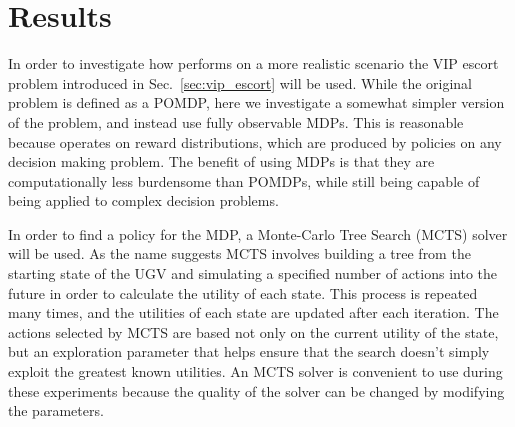 \section{Results} \label{sec:results}
In order to investigate how \xQ{} performs on a more realistic scenario the VIP escort problem introduced in Sec.~\ref{sec:vip_escort} will be used. While the original problem is defined as a POMDP, here we investigate a somewhat simpler version of the problem, and instead use fully observable MDPs. This is reasonable because \xQ{} operates on reward distributions, which are produced by policies on any decision making problem. The benefit of using MDPs is that they are computationally less burdensome than POMDPs, while still being capable of being applied to complex decision problems.

In order to find a policy for the MDP, a Monte-Carlo Tree Search (MCTS) solver will be used. As the name suggests MCTS involves building a tree from the starting state of the UGV and simulating a specified number of actions into the future in order to calculate the utility of each state. This process is repeated many times, and the utilities of each state are updated after each iteration. The actions selected by MCTS are based not only on the current utility of the state, but an exploration parameter that helps ensure that the search doesn't simply exploit the greatest known utilities. An MCTS solver is convenient to use during these experiments because the quality of the solver can be changed by modifying the parameters.

